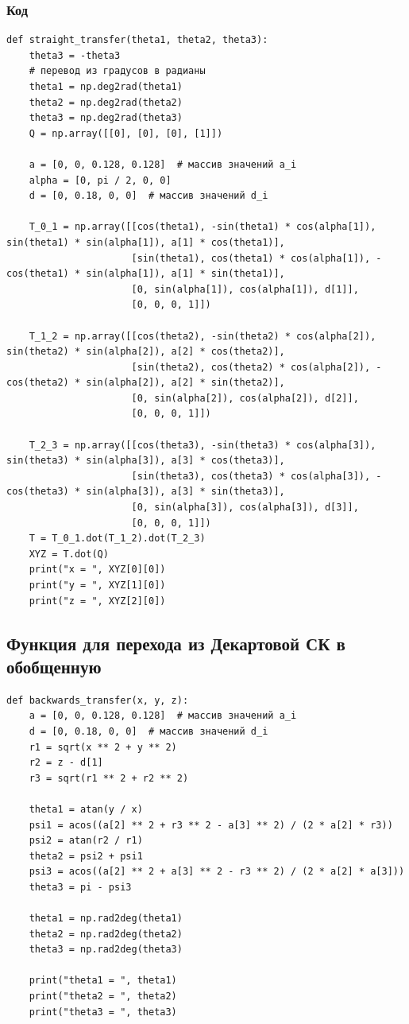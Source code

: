 \documentclass{article}
\begin{document}
\subsubsection*{Код}
\begin{verbatim}
def straight_transfer(theta1, theta2, theta3):
    theta3 = -theta3
    # перевод из градусов в радианы
    theta1 = np.deg2rad(theta1)
    theta2 = np.deg2rad(theta2)
    theta3 = np.deg2rad(theta3)
    Q = np.array([[0], [0], [0], [1]])

    a = [0, 0, 0.128, 0.128]  # массив значений a_i
    alpha = [0, pi / 2, 0, 0]
    d = [0, 0.18, 0, 0]  # массив значений d_i

    T_0_1 = np.array([[cos(theta1), -sin(theta1) * cos(alpha[1]), sin(theta1) * sin(alpha[1]), a[1] * cos(theta1)],
                      [sin(theta1), cos(theta1) * cos(alpha[1]), -cos(theta1) * sin(alpha[1]), a[1] * sin(theta1)],
                      [0, sin(alpha[1]), cos(alpha[1]), d[1]],
                      [0, 0, 0, 1]])

    T_1_2 = np.array([[cos(theta2), -sin(theta2) * cos(alpha[2]), sin(theta2) * sin(alpha[2]), a[2] * cos(theta2)],
                      [sin(theta2), cos(theta2) * cos(alpha[2]), -cos(theta2) * sin(alpha[2]), a[2] * sin(theta2)],
                      [0, sin(alpha[2]), cos(alpha[2]), d[2]],
                      [0, 0, 0, 1]])

    T_2_3 = np.array([[cos(theta3), -sin(theta3) * cos(alpha[3]), sin(theta3) * sin(alpha[3]), a[3] * cos(theta3)],
                      [sin(theta3), cos(theta3) * cos(alpha[3]), -cos(theta3) * sin(alpha[3]), a[3] * sin(theta3)],
                      [0, sin(alpha[3]), cos(alpha[3]), d[3]],
                      [0, 0, 0, 1]])
    T = T_0_1.dot(T_1_2).dot(T_2_3)
    XYZ = T.dot(Q)
    print("x = ", XYZ[0][0])
    print("y = ", XYZ[1][0])
    print("z = ", XYZ[2][0])
\end{verbatim}

\subsection{Функция для перехода из Декартовой СК в обобщенную}
\begin{verbatim}
def backwards_transfer(x, y, z):
    a = [0, 0, 0.128, 0.128]  # массив значений a_i
    d = [0, 0.18, 0, 0]  # массив значений d_i
    r1 = sqrt(x ** 2 + y ** 2)
    r2 = z - d[1]
    r3 = sqrt(r1 ** 2 + r2 ** 2)
    
    theta1 = atan(y / x)
    psi1 = acos((a[2] ** 2 + r3 ** 2 - a[3] ** 2) / (2 * a[2] * r3))
    psi2 = atan(r2 / r1)
    theta2 = psi2 + psi1
    psi3 = acos((a[2] ** 2 + a[3] ** 2 - r3 ** 2) / (2 * a[2] * a[3]))
    theta3 = pi - psi3

    theta1 = np.rad2deg(theta1)
    theta2 = np.rad2deg(theta2)
    theta3 = np.rad2deg(theta3)

    print("theta1 = ", theta1)
    print("theta2 = ", theta2)
    print("theta3 = ", theta3)
\end{verbatim}
\end{document}
